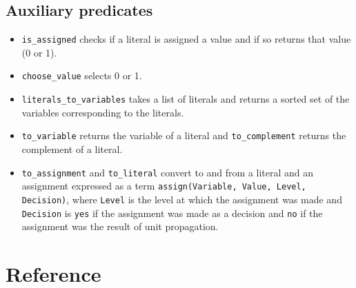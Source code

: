 \documentclass[11pt]{article}
\newcommand*{\p}[1]{\textup{\texttt{#1}}}
\begin{document}
\subsection{Auxiliary predicates}\label{s.aux}

\begin{itemize}

\item \p{is\_assigned} checks if a literal is assigned a value
and if so returns that value (0 or 1).

\item \p{choose\_value} selects 0 or 1. 

\item \p{literals\_to\_variables} takes a list of literals and returns a
sorted set of the variables corresponding to the literals.

\item \p{to\_variable} returns the variable of a literal and
\p{to\_complement} returns the complement of a literal.

\item \p{to\_assignment} and \p{to\_literal} convert to and from a
literal and an assignment expressed as a term \p{assign(Variable, Value,
Level, Decision)}, where \p{Level} is the level at which the assignment
was made and \p{Decision} is \p{yes} if the assignment was
made as a decision and \p{no} if the assignment was the result of unit
propagation.

\end{itemize}





\newpage

\appendix
\section{Reference}

\bigskip\bigskip
\end{document}
